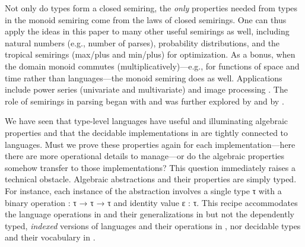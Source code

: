 \documentclass[acmsmall,screen,anonymous,timestamp]{acmart}
\begin{document}
Not only do types form a closed semiring, the \emph{only} properties needed from types in the monoid semiring come from the laws of closed semirings.
One can thus apply the ideas in this paper to many other useful semirings as well, including natural numbers (e.g., number of parses), probability distributions, and the tropical semirings (max/plus and min/plus) for optimization.
As a bonus, when the domain monoid commutes (multiplicatively)---e.g., for functions of space and time rather than languages---the monoid semiring does as well.
Applications include power series (univariate and multivariate) and image processing \citep{Elliott2019-convolution}.
The role of semirings in parsing began with \citet{Chomsky1959CFL} and was further explored by \citet{Goodman1998PIO, Goodman1999SP} and by \citet{Liu2004}.


\rnc{}

We have seen that type-level languages have useful and illuminating algebraic properties and that the decidable implementations in  are tightly connected to languages.
Must we prove these properties again for each implementation---here there are more operational details to manage---or do the algebraic properties somehow transfer to those implementations?
This question immediately raises a technical obstacle.
Algebraic abstractions and their properties are simply typed.
For instance, each instance of the  abstraction involves a single type \AB τ with a binary operation { \AK : \AB τ \AK → \AB τ \AK → \AB τ} and identity value {\AB ε \AK : \AB τ}.
This recipe accommodates the language operations in  and their generalizations in  but not the dependently typed, \emph{indexed} versions of languages and their operations in , nor decidable types and their vocabulary in .
\end{document}
